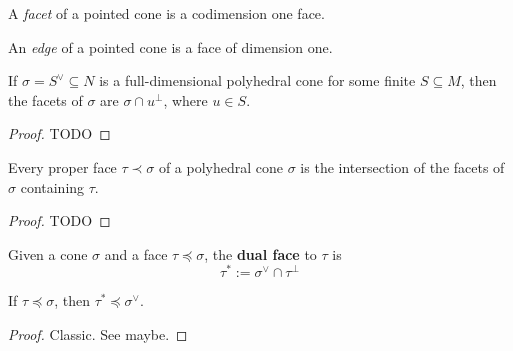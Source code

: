 \begin{definition}[Facets]
  \label{3-facet}
  A \emph{facet} of a pointed cone is a codimension one face.
\end{definition}

\begin{definition}[Edges]
  \label{3-edge}
  An \emph{edge} of a pointed cone is a face of dimension one.
\end{definition}

\begin{proposition}
  \label{3-facet-full-dim-cone}
  If \( \sigma = S^{\vee} \subseteq N \) is a full-dimensional
  polyhedral cone for some finite \( S \subseteq M \), then the facets
  of \( \sigma \) are \( \sigma \cap u^{\perp} \), where \( u \in S
  \).
\end{proposition}
\begin{proof}
  \uses{}
  TODO
\end{proof}

\begin{proposition}
  \label{3-face-equals-inter-facets}
  Every proper face \( \tau \prec \sigma \) of a polyhedral cone \(
  \sigma \) is the intersection of the facets of \( \sigma \) containing
  \( \tau \).
\end{proposition}
\begin{proof}
  \uses{}
  TODO
\end{proof}


\begin{definition}
  \label{3-dual-face}
  Given a cone $\sigma$ and a face $\tau \preceq \sigma$, the {\bf dual face} to $\tau$ is
  $$\tau^* := \sigma^\vee \cap \tau^\perp$$
\end{definition}


\begin{proposition}
  \label{3-dual-face-face-dual}

  If $\tau \preceq \sigma$, then $\tau^* \preceq \sigma^\vee$.
\end{proposition}
\begin{proof}
  \uses{}

  Classic. See \cite{Oda_1988} maybe.
\end{proof}


